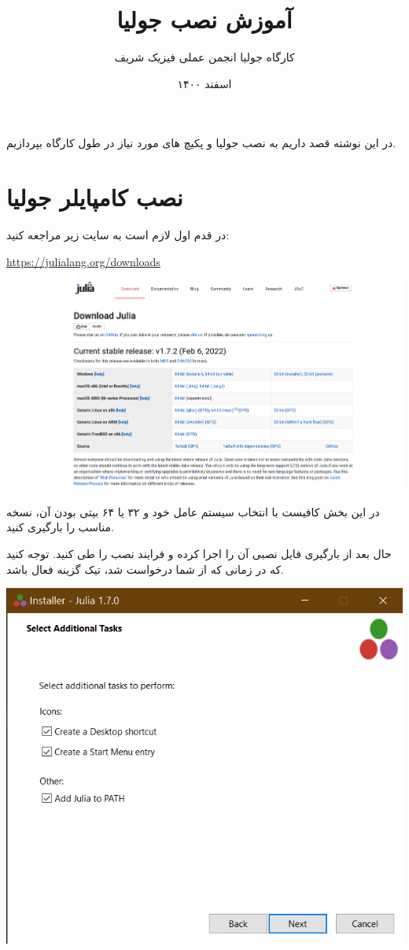 \documentclass[a4paper]{article}
\title{آموزش نصب جولیا }
\author{کارگاه جولیا انجمن عملی فیزیک شریف}
\date{اسفند ۱۴۰۰}
\begin{document}
	\maketitle
	\doublespacing
	در این نوشته قصد داریم به نصب جولیا و پکیچ های مورد نیاز در طول کارگاه بپردازیم.

	\section{نصب کامپایلر جولیا}
	 در قدم اول لازم است به سایت زیر مراجعه کنید:
	\begin{latin}
		\url{https://julialang.org/downloads} \\
	\end{latin}

	\includegraphics[width = \textwidth]{../img/img-1}

	در این بخش کافیست با انتخاب سیستم عامل خود و ۳۲ یا ۶۴ بیتی بودن آن، نسخه مناسب را بارگیری کنید.

	حال بعد از بارگیری فایل نصبی آن را اجرا کرده و فرایند نصب را طی کنید. توجه کنید که در زمانی که از شما درخواست شد، تیک گزینه  فعال باشد.

	\begin{center}
		\includegraphics[height = \textheight/5]{../img/img-2} \\
	\end{center}
	 
\end{document}
